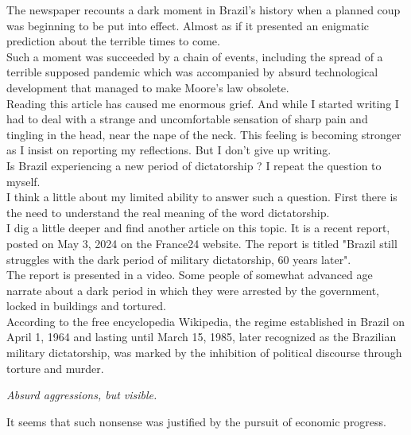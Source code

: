 \documentclass[11pt]{book}
\begin{document}
\noindent The newspaper recounts a dark moment in Brazil's history when a planned coup was beginning to be put into effect. Almost as if it presented an enigmatic prediction about the terrible times to come. \\

\noindent Such a moment was succeeded by a chain of events, including the spread of a terrible supposed pandemic which was accompanied by absurd technological development that managed to make Moore's law obsolete. \\

\noindent Reading this article has caused me enormous grief. And while I started writing I had to deal with a strange and uncomfortable sensation of sharp pain and tingling in the head, near the nape of the neck. This feeling is becoming stronger as I insist on reporting my reflections. But I don't give up writing. \\

\noindent Is Brazil experiencing a new period of dictatorship ? I repeat the question to myself. \\

\noindent I think a little about my limited ability to answer such a question. First there is the need to understand the real meaning of the word dictatorship. \\

\noindent I dig a little deeper and find another article on this topic. It is a recent report, posted on May 3, 2024 on the France24 website. The report is titled "Brazil still struggles with the dark period of military dictatorship, 60 years later". \\

\noindent The report is presented in a video. Some people of somewhat advanced age narrate about a dark period in which they were arrested by the government, locked in buildings and tortured. \\

\noindent According to the free encyclopedia Wikipedia, the regime established in Brazil on April 1, 1964 and lasting until March 15, 1985, later recognized as the Brazilian military dictatorship, was marked by the inhibition of political discourse through torture and murder.

\noindent \begin{center} \emph{Absurd aggressions, but visible.} \end{center}

\noindent It seems that such nonsense was justified by the pursuit of economic progress. \\
\end{document}
